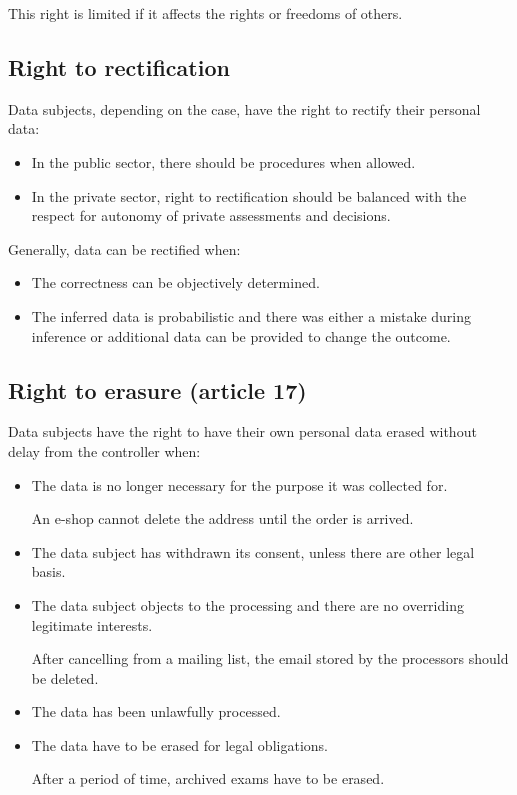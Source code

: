 This right is limited if it affects the rights or freedoms of others.


\subsection{Right to rectification} 

Data subjects, depending on the case, have the right to rectify their personal data:
\begin{itemize}
    \item In the public sector, there should be procedures when allowed.
    \item In the private sector, right to rectification should be balanced with the respect for autonomy of private assessments and decisions.
\end{itemize}

Generally, data can be rectified when:
\begin{itemize}
    \item The correctness can be objectively determined.
    \item The inferred data is probabilistic and there was either a mistake during inference or additional data can be provided to change the outcome. 
\end{itemize}


\subsection{Right to erasure (article 17)} 

Data subjects have the right to have their own personal data erased without delay from the controller when:
\begin{itemize}
    \item The data is no longer necessary for the purpose it was collected for.
    \begin{example}
        An e-shop cannot delete the address until the order is arrived.
    \end{example}

    \item The data subject has withdrawn its consent, unless there are other legal basis.
    
    \item The data subject objects to the processing and there are no overriding legitimate interests.
    \begin{example}
        After cancelling from a mailing list, the email stored by the processors should be deleted.
    \end{example}

    \item The data has been unlawfully processed.
    
    \item The data have to be erased for legal obligations.
    \begin{example}
        After a period of time, archived exams have to be erased.
    \end{example}
\end{itemize}


